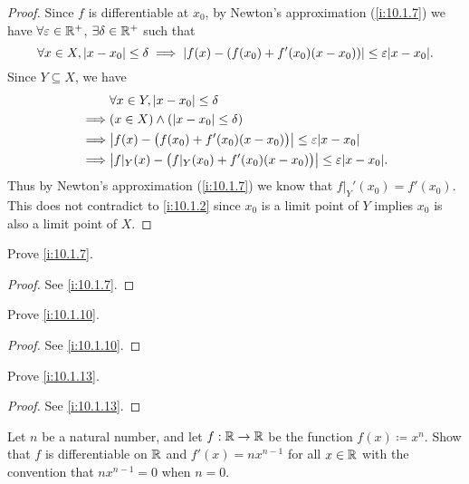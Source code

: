 \begin{proof}
  Since \(f\) is differentiable at \(x_0\), by Newton's approximation (\cref{i:10.1.7}) we have \(\forall \varepsilon \in \mathbb{R}^+\), \(\exists \delta \in \mathbb{R}^+\) such that
  \[
    \forall x \in X, \abs{x - x_0} \leq \delta \implies \abs{f(x) - (f(x_0) + f'(x_0)(x - x_0))} \leq \varepsilon \abs{x - x_0}.
  \]
  Since \(Y \subseteq X\), we have
  \begin{align*}
             & \forall x \in Y, \abs{x - x_0} \leq \delta                                             \\
    \implies & (x \in X) \land (\abs{x - x_0} \leq \delta)                                            \\
    \implies & \abs{f(x) - \big(f(x_0) + f'(x_0)(x - x_0)\big)} \leq \varepsilon \abs{x - x_0}        \\
    \implies & \abs{f|_Y(x) - \big(f|_Y(x_0) + f'(x_0)(x - x_0)\big)} \leq \varepsilon \abs{x - x_0}.
  \end{align*}
  Thus by Newton's approximation (\cref{i:10.1.7}) we know that \(f|_Y'(x_0) = f'(x_0)\).
  This does not contradict to \cref{i:10.1.2} since \(x_0\) is a limit point of \(Y\) implies \(x_0\) is also a limit point of \(X\).
\end{proof}

\begin{ex}\label{i:ex:10.1.2}
  Prove \cref{i:10.1.7}.
\end{ex}

\begin{proof}
  See \cref{i:10.1.7}.
\end{proof}

\begin{ex}\label{i:ex:10.1.3}
  Prove \cref{i:10.1.10}.
\end{ex}

\begin{proof}
  See \cref{i:10.1.10}.
\end{proof}

\begin{ex}\label{i:ex:10.1.4}
  Prove \cref{i:10.1.13}.
\end{ex}

\begin{proof}
  See \cref{i:10.1.13}.
\end{proof}

\begin{ex}\label{i:ex:10.1.5}
  Let \(n\) be a natural number, and let \(f : \mathbb{R} \to \mathbb{R}\) be the function \(f(x) \coloneqq x^n\).
  Show that \(f\) is differentiable on \(\mathbb{R}\) and \(f'(x) = n x^{n - 1}\) for all \(x \in \mathbb{R}\) with the convention that \(n x^{n - 1} = 0\) when \(n = 0\).
\end{ex}

